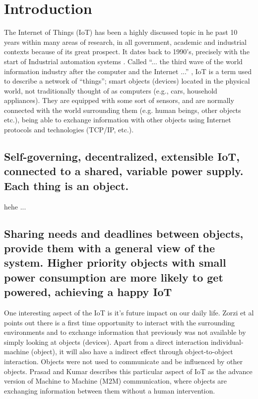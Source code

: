 \documentclass[../main/Self-Stabilization.tex]{subfiles}
\begin{document}
\section{Introduction}\label{intro}
The Internet of Things (IoT) has been a highly discussed topic in he past 10 years within many areas of research, in all government, academic and industrial contexts because of its great prospect. It dates back to 1990's, precisely with the start of Industrial automation systems \cite{prasad2012energy}. Called ``... the third wave of the world information industry after the computer and the Internet ...'' \cite{IoT6150221}, IoT is a term used to describe a network of ``things''; smart objects (devices) located in the physical world, not traditionally thought of as computers (e.g., cars, household appliances). They are equipped with some sort of sensors, and are normally connected with the world surrounding them (e.g. human beings, other objects etc.), being able to exchange information with other objects using Internet protocols and technologies (TCP/IP, etc.).
\subsection{Self-governing, decentralized, extensible IoT, connected to a shared, variable power supply. Each thing is an object.}

hehe ...

\subsection{Sharing needs and deadlines between objects, provide them with a general view of the system. Higher priority objects with small power consumption are more likely to get powered, achieving a happy IoT}
One interesting aspect of the IoT is it's future impact on our daily life. Zorzi et al \cite{zorzi2010today} points out there is a first time opportunity to interact with the surrounding environments and to exchange information that previously was not available by simply looking at objects (devices). Apart from a direct interaction individual-machine (object), it will also have a indirect effect through object-to-object interaction. Objects were not used to communicate and be influenced by other objects. Prasad and Kumar \cite{prasad2012energy} describes this particular aspect of IoT as the advance version of Machine to Machine (M2M) communication, where objects are exchanging information between them without a human intervention.
\end{document}
